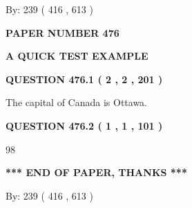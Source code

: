 \documentclass[12pt]{article}
\begin{document}
   
\hspace{1.0in} By: 
 239 ( 416 ,  613 )
   
   
   
   
\newpage 
\setcounter{page}{ 
   476001 } 
   
   
   
   
 {\textbf{ \Large{ PAPER NUMBER  476  }}}
   
   
\vspace{0.2in}
   
   
   
   
   
   
 \vspace{0.2in}
{\LARGE {\textbf{ A QUICK TEST EXAMPLE}}}
   
   
  
\vspace{0.2in}
  
{\textbf{\Large{QUESTION
476.1 
 ( 2 , 2 , 201 )
}}}
  
  
 
 
\noindent{}
 
 
The capital of Canada is Ottawa.
 
 
 
 
  
\vspace{0.2in}
  
{\textbf{\Large{QUESTION
476.2 
 ( 1 , 1 , 101 )
}}}
  
  
 
 
\noindent{}

98
 
 
   
   
 \vspace{0.2in}
 
   
   
   
   
\vspace{1.0in} 
{\textbf{\large{ *** END OF PAPER, THANKS *** }}} 
   
   
\hspace{1.0in} By: 
 239 ( 416 ,  613 )
   
   
   
   
\newpage 
\setcounter{page}{ 
   477001 } 
   
   
   
\end{document}

